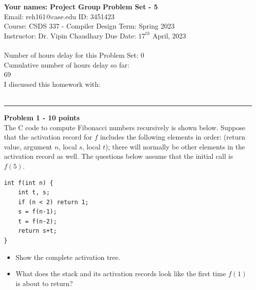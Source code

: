 \documentclass[a4paper, 11pt]{article}
\newenvironment{problem}[2][Problem]
    { \begin{mdframed}[backgroundcolor=gray!20] \textbf{#1 #2} \\}
    {  \end{mdframed}}
\begin{document}
\noindent
\large\textbf{Your names: Project Group} \hfill \textbf{Problem Set - 5}   \\
Email: reh161@case.edu \hfill ID: 3451423\\
\normalsize Course: CSDS 337 - Compiler Design \hfill Term: Spring 2023\\
Instructor: Dr. Vipin Chaudhary \hfill Due Date: $17^{th}$ April, 2023 \\ \\
Number of hours delay for this Problem Set: \hfill 0 \\
Cumulative number of hours delay so far: \hfill \\ 69 \\
I discussed this homework with: \hfill \\ \\

\noindent\rule{7in}{2.8pt}



\begin{problem}{1 - 10 points}
The C code to compute Fibonacci numbers recursively is shown below. Suppose that the activation record for $f$ includes the following elements  in order: (return value, argument $n$, local $s$, local $t$); there will normally be  other elements in the activation record as well. The questions below assume  that the initial call is $f(5)$.  

\begin{verbatim}
int f(int n) {  
    int t, s;  
    if (n < 2) return 1;  
    s = f(n-1);  
    t = f(n-2);  
    return s+t;  
} 

\end{verbatim}
\begin{itemize}[a]
    \item Show the complete activation tree.  
    \item What does the stack and its activation records look like the first time $f(1)$  is about to return?   
    
\end{itemize}

\end{problem}
\end{document}
